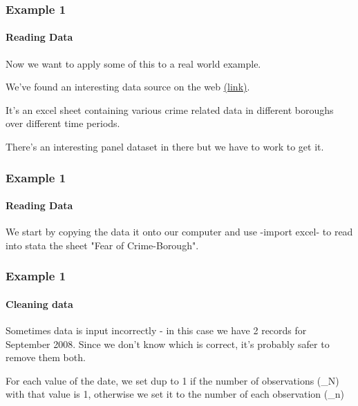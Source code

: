 \documentclass{beamer}
\begin{document}
\begin{frame}
  \frametitle{Example 1}
  \framesubtitle{Reading Data}
Now we want to apply some of this to a real world example.

\medskip

We've found an interesting data source on the web \href{http://data.london.gov.uk/dataset/metropolitan-police-service-recorded-crime-figures-and-associated-data/resource/e831234d-2bde-4fff-8ab8-7e2e70f0677a}{(link)}.  

\medskip

It's an excel sheet containing various crime related data in different boroughs over different time periods.

\medskip

There's an interesting panel dataset in there but we have to work to get it.

\end{frame}

\begin{frame}
  \frametitle{Example 1}
  \framesubtitle{Reading Data}

We start by copying the data it onto our computer and use -import excel- to read into stata the sheet "Fear of Crime-Borough".


\end{frame}




\begin{frame}
  \frametitle{Example 1}
  \framesubtitle{Cleaning data}
Sometimes data is input incorrectly - in this case we have 2 records for September 2008. Since we don't know which is correct, it's probably safer to remove them both.



For each value of the date, we set dup to 1 if the number of observations (\_N) with that value is 1, otherwise we set it to the number of each observation (\_n)

\end{frame}
\end{document}
